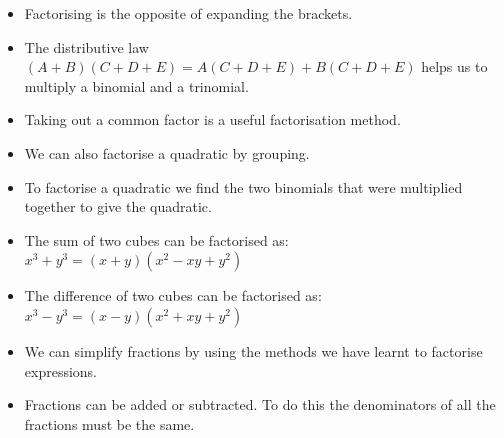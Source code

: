 \begin{itemize}[itemsep=5pt, label=\textbullet{}]
\item Factorising is the opposite of expanding the brackets.
\item The distributive law $\left(A+B\right)\left(C+D+E\right)=A\left(C+D+E\right)+B\left(C+D+E\right)$ helps us to multiply a binomial and a trinomial.
\item Taking out a common factor is a useful factorisation method.
\item We can also factorise a quadratic by grouping.
\item To factorise a quadratic we find the two binomials that were multiplied together to give the quadratic.
\item The sum of two cubes can be factorised as: ${x}^{3}+{y}^{3}=\left(x+y\right)\left({x}^{2}-xy+{y}^{2}\right)$ 
\item The difference of two cubes can be factorised as: ${x}^{3}-{y}^{3}=\left(x-y\right)\left({x}^{2}+xy+{y}^{2}\right)$
\item We can simplify fractions by using the methods we have learnt to factorise expressions.
\item Fractions can be added or subtracted. To do this the denominators of all the fractions must be the same.

\end{itemize}


